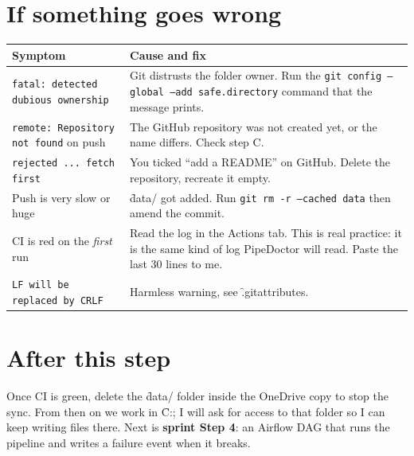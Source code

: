 \documentclass[11pt,a4paper]{article}
\let\oldsection\section
\renewcommand{\section}{\Needspace*{9\baselineskip}\oldsection}
\begin{document}
\section{If something goes wrong}
\begin{tabularx}{\textwidth}{@{}p{5.4cm}X@{}}
\toprule
Symptom & Cause and fix \\
\midrule
\texttt{fatal: detected dubious ownership} & Git distrusts the folder owner. Run the \texttt{git config --global --add safe.directory} command that the message prints. \\
\texttt{remote: Repository not found} on push & The GitHub repository was not created yet, or the name differs. Check step C. \\
\texttt{rejected ... fetch first} & You ticked ``add a README'' on GitHub. Delete the repository, recreate it empty. \\
Push is very slow or huge & \f{data/} got added. Run \texttt{git rm -r --cached data} then amend the commit. \\
CI is red on the \emph{first} run & Read the log in the Actions tab. This is real practice: it is the same kind of log PipeDoctor will read. Paste the last 30 lines to me. \\
\texttt{LF will be replaced by CRLF} & Harmless warning, see \f{.gitattributes}. \\
\bottomrule
\end{tabularx}

\section{After this step}
Once CI is green, delete the \f{data/} folder inside the OneDrive copy to stop the sync. From then on we work in \f{C:\dev\pipedoctor}; I will ask for access to that folder so I can keep writing files there. Next is \textbf{sprint Step 4}: an Airflow DAG that runs the pipeline and writes a failure event when it breaks.
\end{document}
